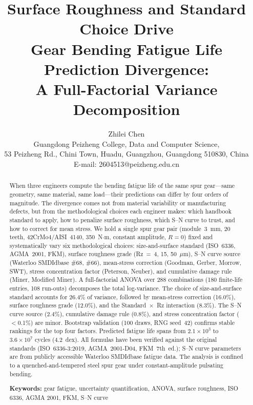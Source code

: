 \documentclass[12pt,a4paper]{article}
\begin{document}
\title{\textbf{Surface Roughness and Standard Choice Drive\\
Gear Bending Fatigue Life Prediction Divergence:\\
A Full-Factorial Variance Decomposition}}

\author{Zhilei Chen\\
Guangdong Peizheng College, Data and Computer Science,\\
53 Peizheng Rd., Chini Town, Huadu, Guangzhou, Guangdong 510830, China\\
E-mail: 2604513@peizheng.edu.cn}

\maketitle

\begin{abstract}
\label{sec:abstract}

When three engineers compute the bending fatigue life of the same spur
gear---same geometry, same material, same load---their predictions can
differ by four orders of magnitude. The divergence comes not from
material variability or manufacturing defects, but from the
methodological choices each engineer makes: which handbook standard to
apply, how to penalize surface roughness, which S--N curve to trust,
and how to correct for mean stress. We hold a single spur gear pair
(module~3~mm, 20 teeth, 42CrMo4/AISI~4140, 350~N$\cdot$m, constant
amplitude, $R=0$) fixed and systematically vary six methodological
choices: size-and-surface standard (ISO~6336, AGMA~2001, FKM), surface
roughness grade (Rz~=~4, 15, 50~$\mu$m), S--N curve source (Waterloo
SMDIdbase \#68, \#66), mean-stress correction (Goodman, Gerber, Morrow,
SWT), stress
concentration factor (Peterson, Neuber), and cumulative damage rule
(Miner, Modified Miner). A full-factorial ANOVA over 288 combinations
(180 finite-life entries, 108 run-outs) decomposes the total log-variance.
The choice of size-and-surface standard accounts for 26.4\% of variance,
followed by mean-stress correction (16.0\%), surface roughness grade
(12.0\%), and the Standard~$\times$~Rz interaction (8.3\%). The S--N
curve source (2.4\%), cumulative damage rule (0.8\%), and stress
concentration factor ($<$0.1\%) are minor. Bootstrap validation (100
draws, RNG seed~42) confirms stable rankings for the top four factors.
Predicted fatigue life spans from $2.1\times10^3$ to $3.6\times10^7$
cycles (4.2~dex). All formulas have been verified against the original
standards (ISO~6336-3:2019, AGMA~2001-D04, FKM~7th~ed.); S--N curve
parameters are from publicly accessible Waterloo SMDIdbase fatigue
data. The analysis is confined to a quenched-and-tempered steel spur
gear under constant-amplitude pulsating bending.

\textbf{Keywords:} gear fatigue, uncertainty quantification, ANOVA,
surface roughness, ISO 6336, AGMA 2001, FKM, S--N curve
\end{abstract}
\end{document}

